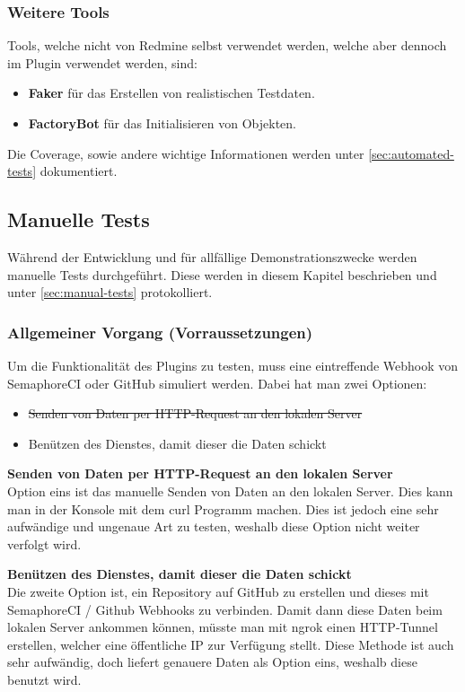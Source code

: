 \subsubsection{Weitere Tools}
Tools, welche nicht von Redmine selbst verwendet werden, welche aber dennoch im Plugin verwendet werden, sind:
\begin{itemize}
  \item \textbf{Faker} für das Erstellen von realistischen Testdaten.
  \item \textbf{FactoryBot} für das Initialisieren von Objekten.
\end{itemize}
Die Coverage, sowie andere wichtige Informationen werden unter \ref{sec:automated-tests} dokumentiert.

\subsection{Manuelle Tests}
\label{sec:manual-testing}
Während der Entwicklung und für allfällige Demonstrationszwecke werden manuelle Tests durchgeführt. Diese
werden in diesem Kapitel beschrieben und unter \ref{sec:manual-tests} protokolliert.

\subsubsection{Allgemeiner Vorgang (Vorraussetzungen)}
\label{sec:general-testing}
Um die Funktionalität des Plugins zu testen, muss eine eintreffende Webhook von SemaphoreCI oder GitHub simuliert werden.
Dabei hat man zwei Optionen:
\begin{itemize}
  \item \st{Senden von Daten per HTTP-Request an den lokalen Server}
  \item Benützen des Dienstes, damit dieser die Daten schickt
\end{itemize}

\textbf{Senden von Daten per HTTP-Request an den lokalen Server} \\
Option eins ist das manuelle Senden von Daten an den lokalen Server. Dies kann man in der Konsole mit dem curl Programm
\cite{everything_curl} machen. Dies ist jedoch eine sehr aufwändige und ungenaue Art zu testen, weshalb diese Option nicht
weiter verfolgt wird. \newline

\textbf{Benützen des Dienstes, damit dieser die Daten schickt} \\
Die zweite Option ist, ein Repository auf GitHub zu erstellen und dieses mit SemaphoreCI / Github Webhooks zu
verbinden. \newline
Damit dann diese Daten beim lokalen Server ankommen können, müsste man mit ngrok \cite{ngrok_http_docs} einen HTTP-Tunnel
erstellen, welcher eine öffentliche IP zur Verfügung stellt. \newline
Diese Methode ist auch sehr aufwändig, doch liefert genauere Daten als Option eins, weshalb diese benutzt wird.

